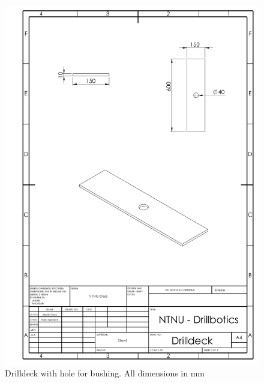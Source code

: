 \newpage
\begin{figure} [H]
\centering
\includegraphics[width=1.0\textwidth]{figures/mechdrawings/Drilldeck.JPG}
\caption{Drilldeck with hole for bushing. All dimensions in mm} 
\label{fig:drilldeck}
\end{figure}

